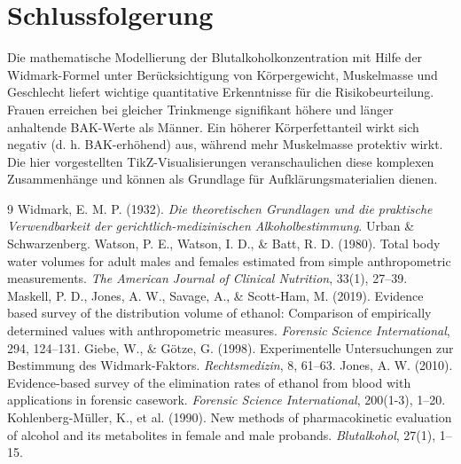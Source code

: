 \documentclass[11pt,a4paper]{article}
\begin{document}
	\section{Schlussfolgerung}
	Die mathematische Modellierung der Blutalkoholkonzentration mit Hilfe der Widmark-Formel unter Berücksichtigung von Körpergewicht, Muskelmasse und Geschlecht liefert wichtige quantitative Erkenntnisse für die Risikobeurteilung. Frauen erreichen bei gleicher Trinkmenge signifikant höhere und länger anhaltende BAK-Werte als Männer. Ein höherer Körperfettanteil wirkt sich negativ (d. h. BAK-erhöhend) aus, während mehr Muskelmasse protektiv wirkt. Die hier vorgestellten TikZ-Visualisierungen veranschaulichen diese komplexen Zusammenhänge und können als Grundlage für Aufklärungsmaterialien dienen.
	
	\begin{thebibliography}{9}
		 Widmark, E. M. P. (1932). \emph{Die theoretischen Grundlagen und die praktische Verwendbarkeit der gerichtlich-medizinischen Alkoholbestimmung}. Urban \& Schwarzenberg.
		 Watson, P. E., Watson, I. D., \& Batt, R. D. (1980). Total body water volumes for adult males and females estimated from simple anthropometric measurements. \emph{The American Journal of Clinical Nutrition}, 33(1), 27–39.
		 Maskell, P. D., Jones, A. W., Savage, A., \& Scott-Ham, M. (2019). Evidence based survey of the distribution volume of ethanol: Comparison of empirically determined values with anthropometric measures. \emph{Forensic Science International}, 294, 124–131.
		 Giebe, W., \& Götze, G. (1998). Experimentelle Untersuchungen zur Bestimmung des Widmark-Faktors. \emph{Rechtsmedizin}, 8, 61–63.
		 Jones, A. W. (2010). Evidence-based survey of the elimination rates of ethanol from blood with applications in forensic casework. \emph{Forensic Science International}, 200(1-3), 1–20.
		 Kohlenberg-Müller, K., et al. (1990). New methods of pharmacokinetic evaluation of alcohol and its metabolites in female and male probands. \emph{Blutalkohol}, 27(1), 1–15.
	\end{thebibliography}
	
\end{document}
